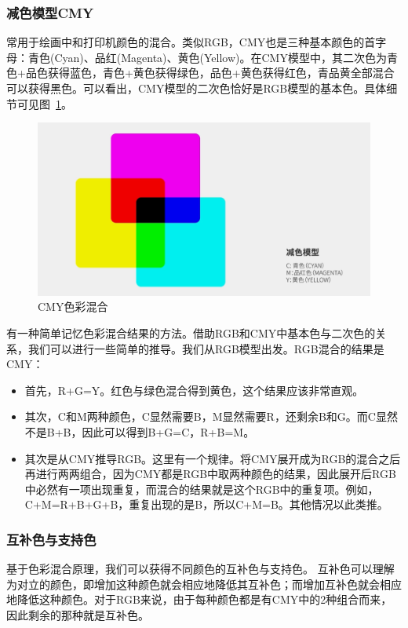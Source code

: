 \documentclass{ctexart}
\begin{document}
\subsubsection{减色模型CMY}
常用于绘画中和打印机颜色的混合。类似RGB，CMY也是三种基本颜色的首字母：青色(Cyan)、品红(Magenta)、黄色(Yellow)。在CMY模型中，其二次色为青色+品色获得蓝色，青色+黄色获得绿色，品色+黄色获得红色，青品黄全部混合可以获得黑色。可以看出，CMY模型的二次色恰好是RGB模型的基本色。具体细节可见图~\ref{fig_cmy}。
\begin{figure}[h!]
    \centering
    \includegraphics[width=.8\linewidth]{imgs/CMY.png}
    \caption{CMY色彩混合}
    \label{fig_cmy}
\end{figure}
有一种简单记忆色彩混合结果的方法。借助RGB和CMY中基本色与二次色的关系，我们可以进行一些简单的推导。我们从RGB模型出发。RGB混合的结果是CMY：
\begin{itemize}
    \item 首先，R+G=Y。红色与绿色混合得到黄色，这个结果应该非常直观。
    \item 其次，C和M两种颜色，C显然需要B，M显然需要R，还剩余B和G。而C显然不是B+B，因此可以得到B+G=C，R+B=M。
    \item 其次是从CMY推导RGB。这里有一个规律。将CMY展开成为RGB的混合之后再进行两两组合，因为CMY都是RGB中取两种颜色的结果，因此展开后RGB中必然有一项出现重复，而混合的结果就是这个RGB中的重复项。例如，C+M=R+B+G+B，重复出现的是B，所以C+M=B。其他情况以此类推。
\end{itemize}

\subsubsection{互补色与支持色}
基于色彩混合原理，我们可以获得不同颜色的互补色与支持色。
互补色可以理解为对立的颜色，即增加这种颜色就会相应地降低其互补色；而增加互补色就会相应地降低这种颜色。对于RGB来说，由于每种颜色都是有CMY中的2种组合而来，因此剩余的那种就是互补色。
\end{document}
